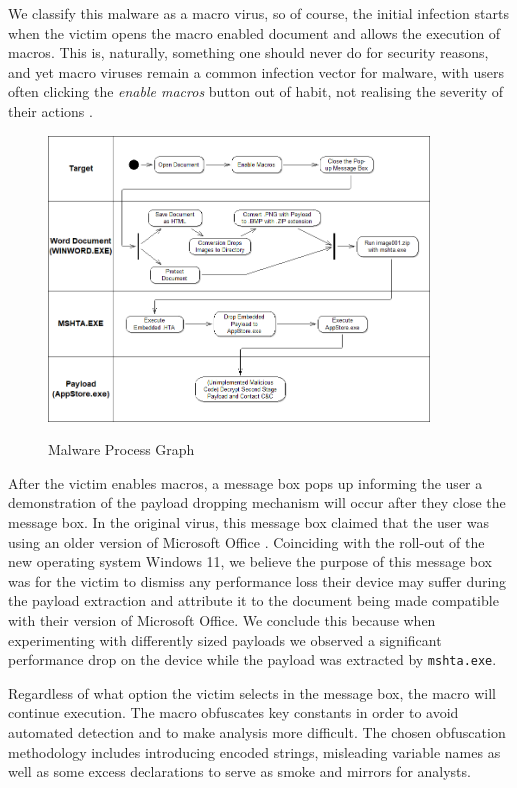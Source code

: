 We classify this malware as a macro virus, so of course, the initial infection starts when the victim opens the macro
enabled document and allows the execution of macros. This is, naturally, something one should never do for security
reasons, and yet macro viruses remain a common infection vector for malware, with users often clicking the \emph{enable
macros} button out of habit, not realising the severity of their actions \cite{macro-viruses-users}.

\begin{figure}[H]
  \centering
  \includegraphics[width=0.9\textwidth]{figures/malware-process-graph.png}
  \label{process-graph}
  \caption{Malware Process Graph}
\end{figure}

After the victim enables macros, a message box pops up informing the user a demonstration of the payload dropping
mechanism will occur after they close the message box. In the original virus, this message box claimed that the user 
was using an older version of Microsoft Office \cite{jazi-article}. Coinciding with the roll-out of the new operating 
system Windows 11, we believe the purpose of this message box was for the victim to dismiss any performance loss their 
device may suffer during the payload extraction and attribute it to the document being made compatible with their version 
of Microsoft Office. 
We conclude this because when experimenting with differently sized payloads we observed a significant performance drop
on the device while the payload was extracted by \verb+mshta.exe+.

Regardless of what option the victim selects in the message box, the macro will continue execution. The macro obfuscates
key constants in order to avoid automated detection and to make analysis more difficult. The chosen obfuscation
methodology includes introducing encoded strings, misleading variable names as well as some excess declarations to 
serve as smoke and mirrors for analysts.

